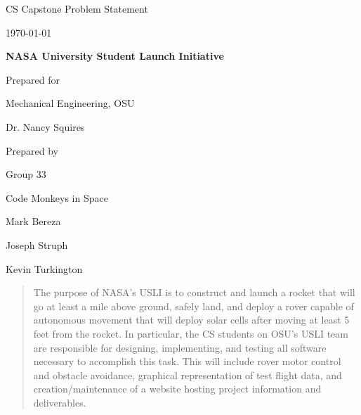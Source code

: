 \documentclass[onecolumn, draftclsnofoot,10pt, compsoc]{IEEEtran}
\def \CapstoneTeamName{		Code Monkeys in Space}
\def \CapstoneTeamNumber{		33}
\def \GroupMemberOne{			Mark Bereza}
\def \GroupMemberTwo{			Joseph Struph}
\def \GroupMemberThree{			Kevin Turkington}
\def \CapstoneProjectName{		NASA University Student Launch Initiative}
\def \CapstoneSponsorCompany{	Mechanical Engineering, OSU}
\def \CapstoneSponsorPerson{		Dr. Nancy Squires}
\def \DocType{		Problem Statement
				}
\newcommand{\NameSigPair}[1]{\par
\makebox[2.75in][r]{#1} \hfil 	\makebox[3.25in]{\makebox[2.25in]{\hrulefill} \hfill		\makebox[.75in]{\hrulefill}}
\par\vspace{-12pt} \textit{\tiny\noindent
\makebox[2.75in]{} \hfil		\makebox[3.25in]{\makebox[2.25in][r]{Signature} \hfill	\makebox[.75in][r]{Date}}}}
\renewcommand{\NameSigPair}[1]{#1}
\begin{document}
\begin{titlepage}
    \begin{singlespace}
        \hfill 
        \par\vspace{.2in}
        \centering
        \scshape{
            \huge CS Capstone \DocType \par
            {\large\today}\par
            \vspace{.5in}
            \textbf{\Huge\CapstoneProjectName}\par
            \vfill
            {\large Prepared for}\par
            \Huge \CapstoneSponsorCompany\par
            \vspace{5pt}
            {\Large\NameSigPair{\CapstoneSponsorPerson}\par}
            {\large Prepared by }\par
            Group\CapstoneTeamNumber\par
            \CapstoneTeamName\par 
            \vspace{5pt}
            {\Large
                \NameSigPair{\GroupMemberOne}\par
                \NameSigPair{\GroupMemberTwo}\par
                \NameSigPair{\GroupMemberThree}\par
            }
            \vspace{20pt}
        }
        \begin{abstract}
        	The purpose of NASA's USLI is to construct and launch a rocket that will go at least a mile above ground, safely land, and deploy a rover capable of autonomous movement that will deploy solar cells after moving at least 5 feet from the rocket. 
			In particular, the CS students on OSU's USLI team are responsible for designing, implementing, and testing all software necessary to accomplish this task. 
			This will include rover motor control and obstacle avoidance, graphical representation of test flight data, and creation/maintenance of a website hosting project information and deliverables.
        \end{abstract}     
    \end{singlespace}
\end{titlepage}
\newpage
{}
\tableofcontents
\clearpage
\end{document}
